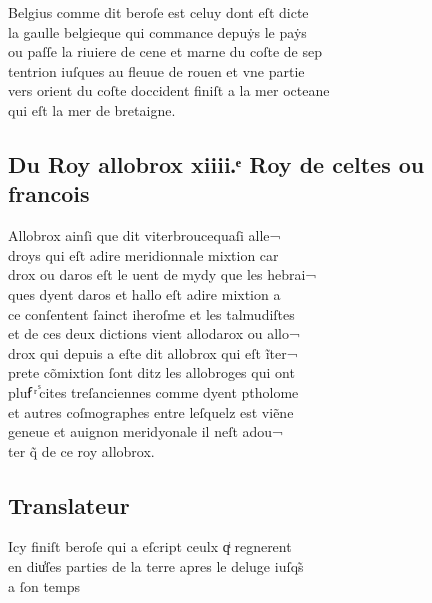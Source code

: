 \documentclass[12pt]{article}
\begin{document}
Belgius comme dit beroſe est celuy dont eſt dicte\\
la gaulle belgieque qui commance
          depuẏs le paẏs\\
ou paſſe la riuiere de cene et marne du coſte de sep\\
tentrion iuſques au fleuue de rouen et vne partie\\
vers orient du coſte
          doccident finiſt a la mer octeane\\
qui eſt la mer de bretaigne.





\newpage
\subsection*{Du Roy allobrox
          xiiii.ͤ Roy de celtes ou francois}


Allobrox ainſi que dit viterbroucequaſi alle¬\\
droys qui eſt adire meridionnale mixtion car\\
drox
              ou daros eſt le uent de mydy que les hebrai¬\\
ques dyent daros et hallo eſt
              adire mixtion a\\
ce conſentent ſainct iheroſme et
          les talmudiſtes\\
et de ces deux dictions vient allodarox ou allo¬\\
drox
          qui depuis a eſte dit allobrox qui eſt ĩter¬\\
prete cõmixtion ſont ditz les allobroges qui ont\\
pluẜ ͬ ᷤcites
          treſanciennes comme dyent ptholome\\
et
          autres coſmographes entre leſquelz est viẽne\\
geneue et auignon meridyonale il
          neſt adou¬\\
ter q̃ de ce roy allobrox.





\subsection*{Translateur}


Icy finiſt beroſe qui a eſcript ceulx qͥ
            regnerent\\
en diu̾ſes parties de la terre apres le deluge iuſqs̃\\
a
          ſon temps
\end{document}
